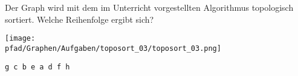 \question[4]
Der Graph wird mit dem im Unterricht vorgestellten Algorithmus topologisch
sortiert. Welche Reihenfolge ergibt sich?

\texttt{[image: \\pfad/Graphen/Aufgaben/toposort\_03/toposort\_03.png]}
\begin{solutionbox}{2cm}
\begin{lstlisting}
g c b e a d f h
\end{lstlisting}
\end{solutionbox}
